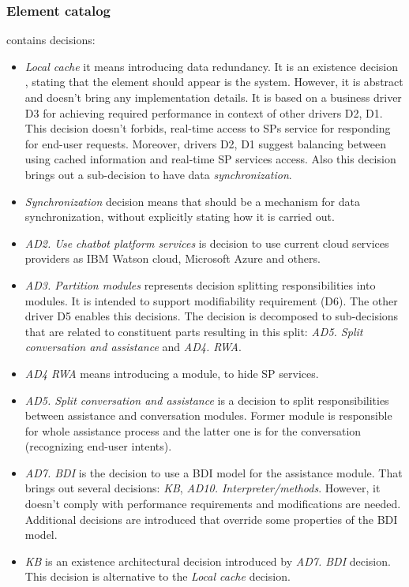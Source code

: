 \documentclass{llncs}
\begin{document}
\subsubsection{Element catalog}
contains decisions: \begin{itemize}
	\item \emph{Local cache} it means introducing data redundancy. It is an existence decision \cite{kruchten2004Ontology}, stating that the element should appear is the system.  However, it is abstract and doesn't bring any implementation details.  It is based on a business driver D3 for achieving required performance in context of other drivers D2, D1. This decision doesn't forbids, real-time access to \gls{SP}s service for responding for end-user requests. Moreover, drivers D2, D1 suggest balancing between using cached information and real-time \gls{SP} services access. Also this decision brings out a sub-decision to have data \emph{synchronization}. 
	\item \emph{Synchronization} decision means that should be a mechanism for data synchronization, without explicitly stating how it is carried out.
	\item \emph{AD2. Use chatbot platform services} is decision to use current cloud services providers as IBM Watson cloud, Microsoft Azure and others.
	\item \emph{AD3. Partition modules} represents decision splitting responsibilities into modules. It is intended to support modifiability requirement (D6). The other driver D5 enables this decisions. The decision is decomposed to sub-decisions that are related to constituent parts resulting in this split: \emph{AD5. Split conversation and assistance} and \emph{AD4. RWA}.
	\item \emph{AD4 RWA} means introducing a module, to hide \gls{SP} services.
	\item \emph{AD5. Split conversation and assistance} is a decision to split responsibilities between assistance and conversation modules. Former module is responsible for whole assistance process and the latter one is for the conversation (recognizing end-user intents).   %
	\item  \emph{AD7. BDI}  is the decision to use a \gls{BDI} model for the assistance module. That brings out several decisions: \emph{KB}, \emph{AD10. Interpreter/methods}. However, it doesn't comply with performance requirements and modifications are needed. Additional decisions are introduced that override some properties of the \gls{BDI} model.
	\item \emph{KB} is an existence architectural decision introduced by \emph{AD7. BDI} decision. This decision is alternative to the \emph{Local cache} decision.

\end{itemize}
\end{document}
